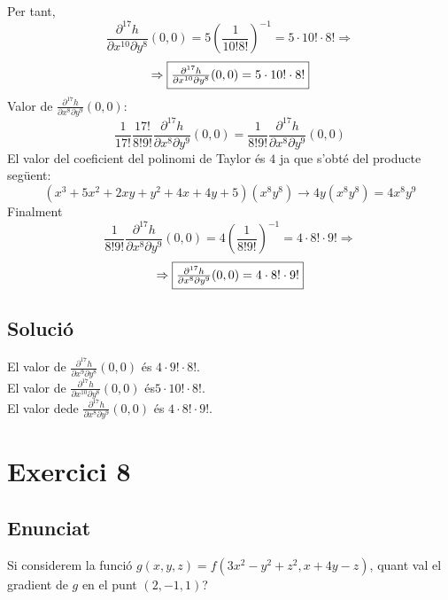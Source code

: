 \documentclass[12pt]{report}
\begin{document}
Per tant,
$$\frac{\partial ^{17} h }{\partial x^{10} \partial y^8}(0,0) = 5 \left( \frac{1}{10!8!}\right)^{-1} = 5\cdot10!\cdot8!\Rightarrow$$
\begin{equation}
    \Rightarrow\fcolorbox{black}{white}{$ \frac{\partial ^{17} h }{\partial x^{10} \partial y^8}(0,0) = 5\cdot10!\cdot8!$}
    \label{probabilitat cristall}
\end{equation}
Valor de $\frac{\partial ^{17} h }{\partial x^{8} \partial y^9}(0,0):$\\
 $$\frac{1}{17!}\frac{17!}{8!9!}\frac{\partial ^{17} h }{\partial x^{8} \partial y^9}(0,0) =  \frac{1}{8!9!}\frac{\partial ^{17} h }{\partial x^{8} \partial y^9}(0,0)$$
El valor del coeficient del polinomi de Taylor és $4$ ja que s'obté del producte següent:
$$(x^{3}+5x^{2}+2xy+y^{2}+4x+4y+5)(x^8y^8)\rightarrow4y(x^8y^8) = 4x^{8}y^9$$ 
Finalment
$$\frac{1}{8!9!}\frac{\partial ^{17} h }{\partial x^{8} \partial y^9}(0,0) = 4 \left(\frac{1}{8!9!}\right)^{-1} = 4\cdot8!\cdot9! \Rightarrow$$
\begin{equation}
    \Rightarrow\fcolorbox{black}{white}{$ \frac{\partial ^{17} h }{\partial x^{8} \partial y^9}(0,0) = 4\cdot8!\cdot9!$}
    \label{probabilitat cristall}
\end{equation}


\section{Solució}
El valor de $\frac{\partial ^{17} h }{\partial x^9 \partial y^8}(0,0)$ és $4\cdot9!\cdot8!$.\\
El valor de $\frac{\partial ^{17} h }{\partial x^{10} \partial y^8}(0,0)$ és$ 5\cdot10!\cdot8!$.\\
El valor dede $\frac{\partial ^{17} h }{\partial x^{8} \partial y^9}(0,0)$ és $4\cdot8!\cdot9!$.


\chapter{Exercici 8}
\section{Enunciat}
Si considerem la funció $g(x,y,z) = f(3x^2-y^2+z^2, x+4y-z)$, quant val el gradient de $g$ en el punt $(2,-1,1)$?
\end{document}
